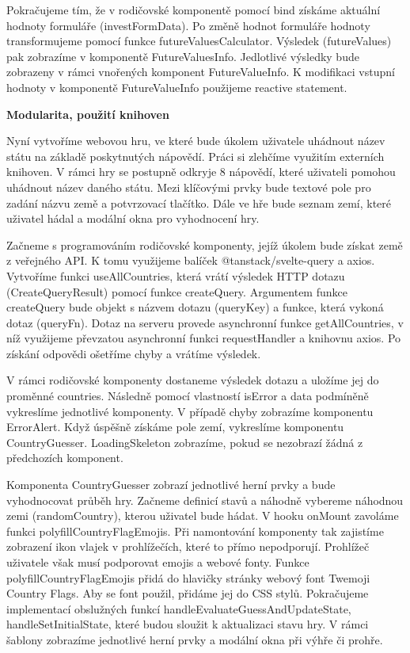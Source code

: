 Pokračujeme tím, že v rodičovské komponentě pomocí bind získáme aktuální hodnoty formuláře (investFormData). Po změně hodnot formuláře hodnoty transformujeme pomocí funkce futureValuesCalculator. 
Výsledek (futureValues) pak zobrazíme v komponentě FutureValuesInfo. Jedlotlivé výsledky bude zobrazeny v rámci vnořených komponent FutureValueInfo. 
K modifikaci vstupní hodnoty v komponentě FutureValueInfo použijeme reactive statement.

\begin{flushleft}
  \textbf{Modularita, použití knihoven}
\end{flushleft}

Nyní vytvoříme webovou hru, ve které bude úkolem uživatele uhádnout název státu na základě poskytnutých nápovědí. Práci si zlehčíme využitím externích knihoven. 
V rámci hry se postupně odkryje 8 nápovědí, které uživateli pomohou uhádnout název daného státu. Mezi klíčovými prvky bude textové pole pro zadání názvu země a potvrzovací tlačítko. 
Dále ve hře bude seznam zemí, které uživatel hádal a modální okna pro vyhodnocení hry.

Začneme s programováním rodičovské komponenty, jejíž úkolem bude získat země z veřejného API. K tomu využijeme balíček @tanstack/svelte-query a axios. 
Vytvoříme funkci useAllCountries, která vrátí výsledek HTTP dotazu (CreateQueryResult) pomocí funkce createQuery. Argumentem funkce createQuery bude objekt s názvem dotazu (queryKey) a funkce, která vykoná dotaz (queryFn). 
Dotaz na serveru provede asynchronní funkce getAllCountries, v níž využijeme převzatou asynchronní funkci requestHandler a knihovnu axios. Po získání odpovědi ošetříme chyby a vrátíme výsledek.

V rámci rodičovské komponenty dostaneme výsledek dotazu a uložíme jej do proměnné countries. Následně pomocí vlastností isError a data podmíněně vykreslíme jednotlivé komponenty. 
V případě chyby zobrazíme komponentu ErrorAlert. Když úspěšně získáme pole zemí, vykreslíme komponentu CountryGuesser. LoadingSkeleton zobrazíme, pokud se nezobrazí žádná z předchozích komponent.

Komponenta CountryGuesser zobrazí jednotlivé herní prvky a bude vyhodnocovat průběh hry. Začneme definicí stavů a náhodně vybereme náhodnou zemi (randomCountry), kterou uživatel bude hádat. 
V hooku onMount zavoláme funkci polyfillCountryFlagEmojis. Při namontování komponenty tak zajistíme zobrazení ikon vlajek v prohlížečích, které to přímo nepodporují. Prohlížeč uživatele však musí podporovat emojis a webové fonty. 
Funkce polyfillCountryFlagEmojis přidá do hlavičky stránky webový font Twemoji Country Flags. Aby se font použil, přidáme jej do CSS stylů. 
Pokračujeme implementací obslužných funkcí handleEvaluateGuessAndUpdateState, handleSetInitialState, které budou sloužit k aktualizaci stavu hry. V rámci šablony zobrazíme jednotlivé herní prvky a modální okna při výhře či prohře.

